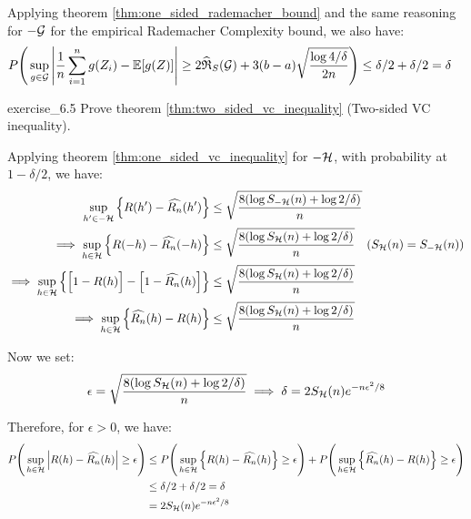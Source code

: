 \begin{solution*}
    \noindent Applying theorem \ref{thm:one_sided_rademacher_bound} and the same reasoning for $-\mathcal{G}$ for the empirical Rademacher Complexity bound, we also have:
    \begin{align*}
        P\Bigg( 
            \sup_{g\in\mathcal{G}}\Bigg| 
                \frac{1}{n}\sum_{i=1}^n g(Z_i) - \mathbb{E}[g(Z)]
             \Bigg| \ge 2\widehat{\mathfrak{R}}_S(\mathcal{G}) + 3(b-a)\sqrt{\frac{\log 4/\delta}{2n}}
         \Bigg)&\le \delta/2 + \delta/2 = \delta
    \end{align*}
\end{solution*}

\begin{exercise}{}{exercise_6.5}
    Prove theorem \ref{thm:two_sided_vc_inequality} (Two-sided VC inequality).
\end{exercise}

\begin{solution*}
    Applying theorem \ref{thm:one_sided_vc_inequality} for $-\mathcal{H}$, with probability at $1-\delta/2$, we have:
    \begin{align*}
        \sup_{h'\in -\mathcal{H}} \Big\{ R(h') - \widehat{R_n}(h') \Big\}  &\le \sqrt{
            \frac{8(\log S_{-\mathcal{H}}(n) + \log 2/\delta)}{n}
        } \\
        \implies
        \sup_{h\in \mathcal{H}} \Big\{ R(-h) - \widehat{R_n}(-h) \Big\}  &\le \sqrt{
            \frac{8(\log S_{\mathcal{H}}(n) + \log 2/\delta)}{n}
        } \ \ \ (S_{\mathcal{H}}(n) = S_{-\mathcal{H}}(n)) \\
        \implies \sup_{h\in \mathcal{H}} \Big\{ \Big[ 1-R(h) \Big] - \Big[ 1-\widehat{R_n}(h) \Big] \Big\}  &\le \sqrt{
            \frac{8(\log S_{\mathcal{H}}(n) + \log 2/\delta)}{n}
        } \\
        \implies
        \sup_{h\in \mathcal{H}} \Big\{ \widehat{R_n}(h) - R(h) \Big\}  &\le \sqrt{
            \frac{8(\log S_{\mathcal{H}}(n) + \log 2/\delta)}{n}
        }
    \end{align*}

    \noindent Now we set:
    \begin{align*}
        \epsilon = \sqrt{
            \frac{8(\log S_{\mathcal{H}}(n) + \log 2/\delta)}{n}
        } \implies \delta = 2S_{\mathcal{H}}(n)e^{-n\epsilon^2/8}
    \end{align*}

    \noindent Therefore, for $\epsilon>0$, we have:
    \begin{align*}
        P\Bigg( 
            \sup_{h\in\mathcal{H}} \Big| 
                R(h) - \widehat{R_n}(h)
             \Big| \ge \epsilon
         \Bigg) &\le P\Bigg( 
            \sup_{h\in\mathcal{H}} \Big\{ 
                R(h) - \widehat{R_n}(h)
             \Big\} \ge \epsilon
         \Bigg) + P\Bigg( 
            \sup_{h\in\mathcal{H}} \Big\{ 
                \widehat{R_n}(h) - R(h)
             \Big\} \ge \epsilon
         \Bigg) \\
        &\le \delta/2 + \delta/2 = \delta \\ 
        &= 2S_{\mathcal{H}}(n)e^{-n\epsilon^2/8}
    \end{align*}


\end{solution*}
